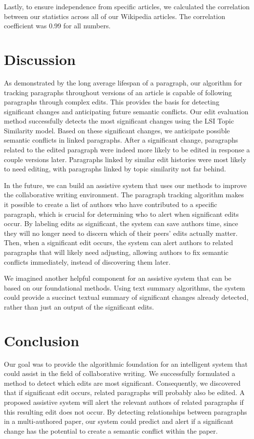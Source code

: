 Lastly, to ensure independence from specific articles, we calculated the
correlation between our statistics across all of our Wikipedia articles.
The correlation coefficient was 0.99 for all numbers.

\section{Discussion}\label{discussion}

As demonstrated by the long average lifespan of a paragraph, our
algorithm for tracking paragraphs throughout versions of an article is
capable of following paragraphs through complex edits. This provides the
basis for detecting significant changes and anticipating future semantic
conflicts. Our edit evaluation method successfully detects the most
significant changes using the LSI Topic Similarity model. Based on these
significant changes, we anticipate possible semantic conflicts in linked
paragraphs. After a significant change, paragraphs related to the edited
paragraph were indeed more likely to be edited in response a couple
versions later. Paragraphs linked by similar edit histories were most
likely to need editing, with paragraphs linked by topic similarity not
far behind.

In the future, we can build an assistive system that uses our methods to
improve the collaborative writing environment. The paragraph tracking
algorithm makes it possible to create a list of authors who have
contributed to a specific paragraph, which is crucial for determining
who to alert when significant edits occur. By labeling edits as
significant, the system can save authors time, since they will no longer
need to discern which of their peers' edits actually matter. Then, when
a significant edit occurs, the system can alert authors to related
paragraphs that will likely need adjusting, allowing authors to fix
semantic conflicts immediately, instead of discovering them later.

We imagined another helpful component for an assistive system that can
be based on our foundational methods. Using text summary algorithms, the
system could provide a succinct textual summary of significant changes
already detected, rather than just an output of the significant edits.

\section{Conclusion}\label{conclusion}

Our goal was to provide the algorithmic foundation for an intelligent
system that could assist in the field of collaborative writing. We
successfully formulated a method to detect which edits are most
significant. Consequently, we discovered that if significant edit
occurs, related paragraphs will probably also be edited. A proposed
assistive system will alert the relevant authors of related paragraphs
if this resulting edit does not occur. By detecting relationships
between paragraphs in a multi-authored paper, our system could predict
and alert if a significant change has the potential to create a semantic
conflict within the paper.
